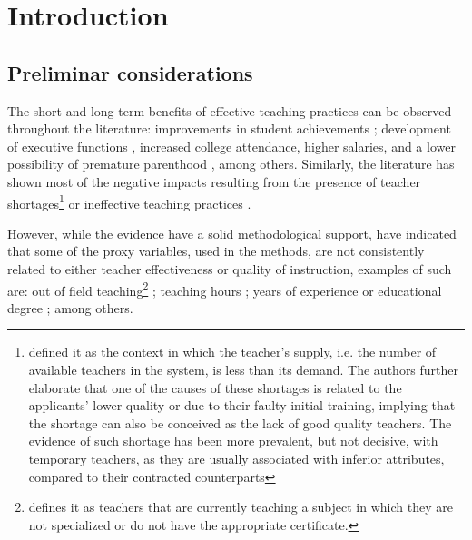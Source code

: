 \chapter{Introduction}

\section{Preliminar considerations}

The short and long term benefits of effective teaching practices can be observed throughout the literature: improvements in student achievements \cite{Rockoff_2004, Rivkin_et_al_2005, Duflo_et_al_2009, Hanushek_et_al_2012, Muralidharan_et_al_2013, Chetty_et_al_2014a, Araujo_et_al_2016}; development of executive functions \cite{Araujo_et_al_2016}, increased college attendance, higher salaries, and a lower possibility of premature parenthood \cite{Chetty_et_al_2014b}, among others. Similarly, the literature has shown most of the negative impacts resulting from the presence of teacher shortages\footnote{\citet{Bertoni_et_al_2020a} defined it as the context in which the teacher's supply, i.e. the number of available teachers in the system, is less than its demand. The authors further elaborate that one of the causes of these shortages is related to the applicants' lower quality or due to their faulty initial training, implying that the shortage can also be conceived as the lack of good quality teachers. The evidence of such shortage has been more prevalent, but not decisive, with temporary teachers, as they are usually associated with inferior attributes, compared to their contracted counterparts} \cite{Duflo_et_al_2009, Muralidharan_et_al_2013, Duflo_et_al_2015, Ayala_2017, Marotta_2019} or ineffective teaching practices \cite{Hanushek_et_al_2012}.

However, while the evidence have a solid methodological support, \citet{Hanushek_et_al_2006} have indicated that some of the proxy variables, used in the methods, are not consistently related to either teacher effectiveness or quality of instruction, examples of such are: out of field teaching\footnote{\citet{Medeiros_et_al_2018} defines it as teachers that are currently teaching a subject in which they are not specialized or do not have the appropriate certificate.} \cite{Ingersoll_1998, Dee_et_al_2008, Bertoni_et_al_2020a}; teaching hours \cite{Bruns_et_al_2015}; years of experience or educational degree \cite{Rockoff_2004, Rivkin_et_al_2005, Clotfelter_et_al_2006, Clotfelter_et_al_2007, Hanushek_et_al_2012}; among others.

